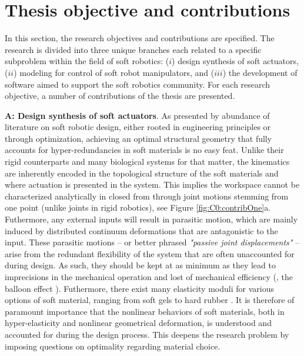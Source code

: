 \newpage
\section{Thesis objective and contributions}
In this section, the research objectives and contributions are specified. The research is divided into three unique branches each related to a specific subproblem within the field of soft robotics: ($i$) design synthesis of soft actuators, ($ii$) modeling for control of soft robot manipulators, and ($iii$) the development of software aimed to support the soft robotics community. For each research objective, a number of contributions of the thesis are presented. 
\vspace{1mm}

\par \textbf{A: Design synthesis of soft actuators}. As presented by abundance of literature on soft robotic design, either rooted in engineering principles or through optimization, achieving an optimal structural geometry that fully accounts for hyper-redundancies in soft materials is no easy feat. Unlike their rigid counterparts and many biological systems for that matter, the kinematics are inherently encoded in the topological structure of the soft materials and where actuation is presented in the system. This implies the workspace cannot be characterized analytically in closed from through joint motions stemming from one point (unlike joints in rigid robotics), see Figure \ref{fig:C0:contribOne}a. Futhermore, any external inputs will result in parasitic motion, which are mainly induced by distributed continuum deformations that are antagonistic to the input. These parasitic motions -- or better phrased \textit{"passive joint displacements"} -- arise from the redundant flexibility of the system that are often unaccounted for during design. As such, they should be kept at as minimum as they lead to imprecisions in the mechanical operation and lost of mechanical efficiency (\eg, the balloon effect \cite{Daerden1999}). Futhermore, there exist many elasticity moduli for various options of soft material, ranging from soft gels to hard rubber \cite{Rus2015}. It is therefore of paramount importance that the nonlinear behaviors of soft materials, both in hyper-elasticity and nonlinear geometrical deformation, is understood and accounted for during the design process. This deepens the research problem by imposing questions on optimality regarding material choice.

